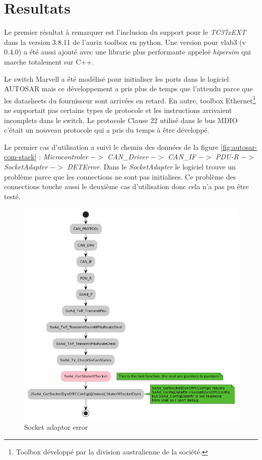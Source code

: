 \section{Resultats} 

Le premier résultat à remarquer est l'inclusion du support pour le \textit{TC37xEXT} dans la version 3.8.11 de l'aurix toolbox en python. Une version pour vlab3 (v 0.4.0) a \'et\'e aussi ajout\'e avec une librarie plus performante appele\'e \textit{hipersim} qui marche totalement sur C++. 

Le switch Marvell a été modélisé pour initialiser les ports dans le logiciel AUTOSAR mais ce développement a pris plus de temps que l'attendu parce que les datasheets du fournisseur sont arrivées en retard. En autre, toolbox Ethernet\footnote{Toolbox développé par la division australienne de la société.} ne supportait pas certains types de protocole et les instructions arrivaient incomplets dans le switch. Le protocole Clause 22 utilis\'e dans le bus MDIO c'était un nouveau protocole qui a pris du temps à être développé.  


Le premier cas d'utilisation a suivi le chemin des données de la figure \ref{fig:autosar-com-stack} : \textit{Microcontroler} $->$ \textit{CAN\_Driver} $->$ \textit{CAN\_IF} $->$ \textit{PDU-R} $->$ \textit{SocketAdapter}\cite{sock_adp_man} $->$ \textit{DETError}\cite{det_man}. Dans le \textit{SocketAdapter} le logiciel trouve un problème parce que les connections ne sont pas initialises. Ce problème des connections touche aussi le deuxième cas d'utilisation donc cela n'a pas pu être test\'e. 

\begin{figure}[!htb] 
\centering 
\includegraphics[width=\textwidth]{img/SoAd_Error.png} 
\caption{Socket adaptor error} 
\label{fig:soad-error} 
\end{figure}
